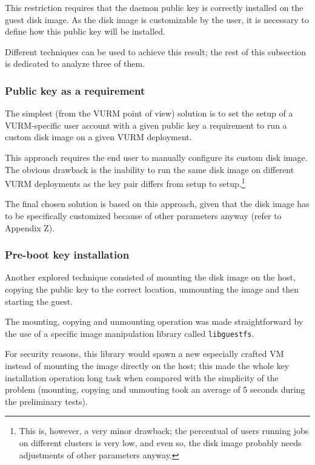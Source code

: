 This restriction requires that the daemon public key is correctly installed on the guest disk image. As the disk image is customizable by the user, it is necessary to define how this public key will be installed.

Different techniques can be used to achieve this result; the rest of this subsection is dedicated to analyze three of them.

\subsubsection{Public key as a requirement}

The simplest (from the VURM point of view) solution is to set the setup of a VURM-specific user account with a given public key a requirement to run a custom disk image on a given VURM deployment.

This approach requires the end user to manually configure its custom disk image. The obvious drawback is the inability to run the same disk image on different VURM deployments as the key pair differs from setup to setup.\footnote{This is, however, a very minor drawback; the percentual of users running jobs on different clusters is very low, and even so, the disk image probably needs adjustments of other parameters anyway.}

The final chosen solution is based on this approach, given that the disk image has to be specifically customized because of other parameters anyway (refer to Appendix Z).

\subsubsection{Pre-boot key installation}

Another explored technique consisted of mounting the disk image on the host, copying the public key to the correct location, unmounting the image and then starting the guest.

The mounting, copying and unmounting operation was made straightforward by the use of a specific image manipulation library called \texttt{libguestfs}.

For security reasons, this library would spawn a new especially crafted VM instead of mounting the image directly on the host; this made the whole key installation operation long task when compared with the simplicity of the problem (mounting, copying and unmouting took an average of 5 seconds during the preliminary tests).

